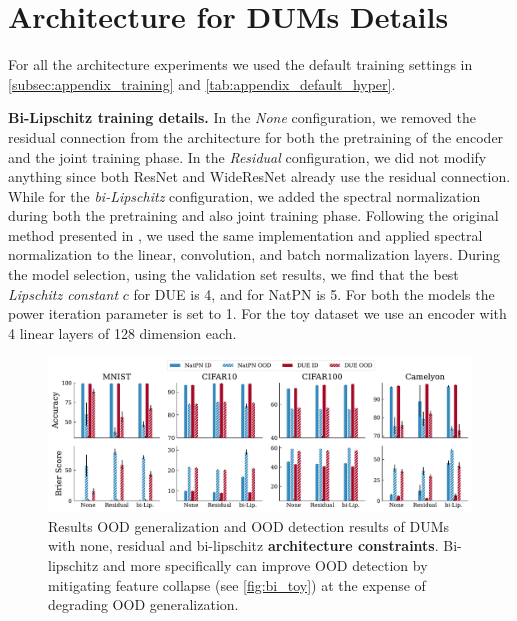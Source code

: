 \section{Architecture for DUMs Details}
\label{subsec:appendix_encoder}





For all the architecture experiments we used the default training settings in \cref{subsec:appendix_training} and \cref{tab:appendix_default_hyper}.

\textbf{Bi-Lipschitz training details.} In the \textit{None} configuration, we removed the residual connection from the architecture for both the pretraining of the encoder and the joint training phase. In the \textit{Residual} configuration, we did not modify anything since both ResNet and WideResNet already use the residual connection. While for the \textit{bi-Lipschitz} configuration, we added the spectral normalization during both the pretraining and also joint training phase. Following the original method presented in \cite{due}, we used the same implementation and applied spectral normalization to the linear, convolution, and batch normalization layers. During the model selection, using the validation set results, we find that the best \textit{Lipschitz constant} $c$ for DUE is 4, and for NatPN is 5. For both the models the power iteration parameter is set to 1. For the toy dataset we use an encoder with 4 linear layers of 128 dimension each.

\begin{figure}[!htb]
    \centering
    \includegraphics[width=\textwidth]{sections/008_iclr2023/figures/bi_bar.pdf}
    \caption{Results OOD generalization and OOD detection results of DUMs with none, residual and bi-lipschitz \textbf{architecture constraints}. Bi-lipschitz and more specifically can improve OOD detection by mitigating feature collapse (see \cref{fig:bi_toy}) at the expense of degrading OOD generalization.}
    \label{fig:bi_bar_full}
\end{figure}

